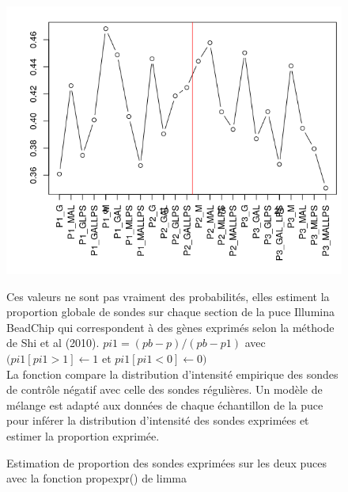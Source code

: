 \documentclass[a4paper,10pt]{article}
\begin{document}
\begin{figure}
 \centering
 \includegraphics[scale=0.5]{../../R/output/propexpr.png}
 \caption{ Estimation de proportion des sondes exprimées sur les deux puces avec la fonction propexpr() de limma}
 Ces valeurs ne sont pas vraiment des probabilités, elles estiment la proportion globale de sondes sur chaque section de la puce Illumina BeadChip qui correspondent à des gènes exprimés selon la méthode de Shi et al (2010)\cite{shi2010estimating}.
 $pi1= (pb-p)/(pb-p1) $ avec $(pi1[pi1 > 1] \leftarrow 1 $ et $pi1[pi1 < 0] \leftarrow 0)$\\
 La fonction compare la distribution d’intensité empirique des sondes de contrôle négatif avec celle des sondes régulières. 
 Un modèle de mélange est adapté aux données de chaque échantillon de la puce pour inférer la distribution d’intensité des sondes exprimées et estimer la proportion exprimée.
\label{fig:propexpr}
 \end{figure}
\end{document}
